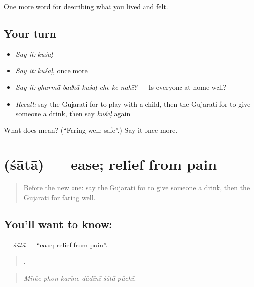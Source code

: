 \begin{grammarlens}[title={What you've built}]
One more word for describing what you lived and felt.
\end{grammarlens}

\subsection*{Your turn}
\begin{itemize}
\raggedright
  \item \emph{Say it:} \emph{kuśaḷ}
  \item \emph{Say it:} \emph{kuśaḷ}, once more
  \item \emph{Say it:} \emph{gharmā̃ badhā kuśaḷ che ke nahī̃?} — Is everyone at home well?
  \item \emph{Recall:} say the Gujarati for to play with a child, then the Gujarati for to give someone a drink, then say \emph{kuśaḷ} again
\end{itemize}

\begin{tcolorbox}[breakable,colback=teal!4,colframe=teal!35!black,title={Before you move on}]
What does  mean? (\textquotedblleft{}Faring well; safe\textquotedblright{}.) Say it once more.
\end{tcolorbox}
\section[\texorpdfstring{\gu{શાતા} (śātā)}{શાતા (śātā)}]{ (śātā) — ease; relief from pain}

\label{lesson:GU-C489-sata}



\begin{quote}
Before the new one: say the Gujarati for to give someone a drink, then the Gujarati for faring well.
\end{quote}

\subsection*{You'll want to know: }
\textbf{} — \emph{śātā} — \textquotedblleft{}ease; relief from pain\textquotedblright{}.

\begin{quote}
     .
\end{quote}

\begin{quote}
\emph{Mīrāe phon karīne dādīnī śātā pūchī.}
\end{quote}

